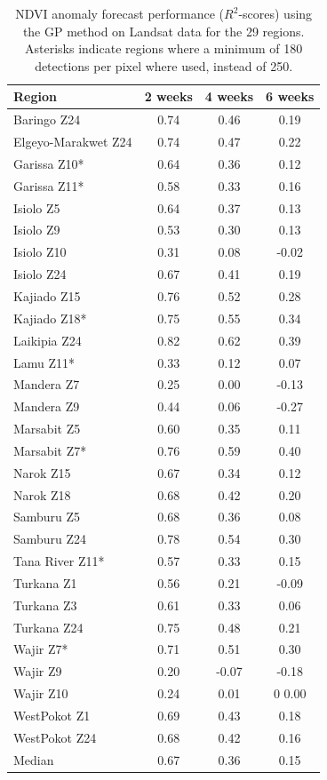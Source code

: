 \documentclass[review]{elsarticle}
\begin{document}
\begin{table}[H]
	\footnotesize
	\caption{NDVI anomaly forecast performance ($R^2$-scores)  using the GP method on Landsat data for the 29 regions. Asterisks indicate regions where a minimum of 180 detections per pixel where used, instead of 250. } \label{tab:NDVI_LS}
	\centering
	\begin{tabular}{l|ccc} 
		\toprule
		\textbf{Region}   & \textbf{2 weeks}  & \textbf{4 weeks}  & \textbf{6 weeks} \\
		\midrule
		Baringo Z24 &  0.74 &  0.46 & 0.19 \\
		Elgeyo-Marakwet Z24 & 0.74 &  0.47 & 0.22 \\
		Garissa Z10* &  0.64 &  0.36 & 0.12 \\
		Garissa Z11* &  0.58 &  0.33 & 0.16 \\
		Isiolo Z5 &  0.64 &  0.37 & 0.13 \\
		Isiolo Z9 &  0.53 &  0.30 & 0.13 \\
		Isiolo Z10 &  0.31 &  0.08 & -0.02 \\
		Isiolo Z24 &  0.67 &  0.41 & 0.19 \\
		Kajiado Z15 &  0.76 &  0.52 & 0.28 \\
		Kajiado Z18* &  0.75 &  0.55 & 0.34 \\
		Laikipia Z24 &  0.82 &  0.62 & 0.39 \\
		Lamu Z11* &  0.33 &  0.12 & 0.07 \\
		Mandera Z7 &  0.25 &  0.00 & -0.13 \\
		Mandera Z9 &  0.44 &  0.06 & -0.27 \\
		Marsabit Z5 &  0.60 &  0.35 & 0.11 \\
		Marsabit Z7* &  0.76 &  0.59 & 0.40 \\
		Narok Z15 &  0.67 &  0.34 & 0.12 \\
		Narok Z18 &  0.68 &  0.42 & 0.20 \\
		Samburu Z5 &  0.68 &  0.36 & 0.08 \\
		Samburu Z24 &  0.78 &  0.54 & 0.30 \\
		Tana River Z11* &  0.57 &  0.33 & 0.15 \\
		Turkana Z1 &  0.56 &  0.21 & -0.09 \\
		Turkana Z3 &  0.61 &  0.33 & 0.06 \\
		Turkana Z24 &  0.75 &  0.48 & 0.21 \\
		Wajir Z7* &  0.71 &  0.51 & 0.30 \\
		Wajir Z9 &  0.20 &  -0.07 & -0.18 \\
		Wajir Z10 &  0.24 &  0.01 &0 0.00 \\
		WestPokot Z1 &  0.69 &  0.43 & 0.18 \\
		WestPokot Z24 &  0.68 &  0.42 & 0.16 \\
		\bottomrule
		Median &  0.67 &  0.36 & 0.15 \\
		\bottomrule
	\end{tabular}
\end{table}
\end{document}
